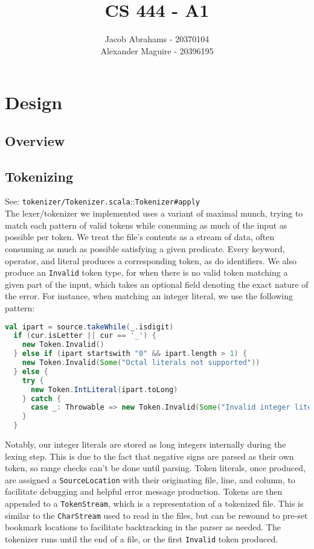 \documentclass{article}
\title{CS 444 - A1}
\author{Jacob Abrahams - 20370104\\ Alexander Maguire - 20396195}
\begin{document}
\newcommand\type[1]{\texttt{#1}}
\renewcommand\value[1]{\texttt{#1}}
\newcommand\source[2]{See: \texttt{#1.scala}::\type{#2} \\}

\maketitle

\section{Design}


\subsection{Overview}


\subsection{Tokenizing}
\source{tokenizer/Tokenizer}{Tokenizer\#apply}
The lexer/tokenizer we implemented uses a variant of maximal munch, trying to match each pattern of valid tokens while consuming as much of the input as possible per token. We treat the file's contents as a stream of data, often consuming as much as possible satisfying a given predicate. Every keyword, operator, and literal produces a corresponding token, as do identifiers. We also produce an {\tt Invalid} token type, for when there is no valid token matching a given part of the input, which takes an optional field denoting the exact nature of the error. For instance, when matching an integer literal, we use the following pattern:
\begin{lstlisting}[language=Scala]
  val ipart = source.takeWhile(_.isdigit)
  if (cur.isLetter || cur == '_') {
    new Token.Invalid()
  } else if (ipart startswith "0" && ipart.length > 1) {
    new Token.Invalid(Some("Octal literals not supported"))
  } else {
    try {
      new Token.IntLiteral(ipart.toLong)
    } catch {
      case _: Throwable => new Token.Invalid(Some("Invalid integer literal "+ ipart))
    }
  }
\end{lstlisting}

Notably, our integer literals are stored as long integers internally during the lexing step. This is due to the fact that negative signs are parsed as their own token, so range checks can't be done until parsing. Token literals, once produced, are assigned a {\tt SourceLocation} with their originating file, line, and column, to facilitate debugging and helpful error message production. Tokens are then appended to a {\tt TokenStream}, which is a representation of a tokenized file. This is similar to the {\tt CharStream} used to read in the files, but can be rewound to pre-set bookmark locations to facilitate backtracking in the parser as needed. The tokenizer runs until the end of a file, or the first {\tt Invalid} token produced.
\end{document}
